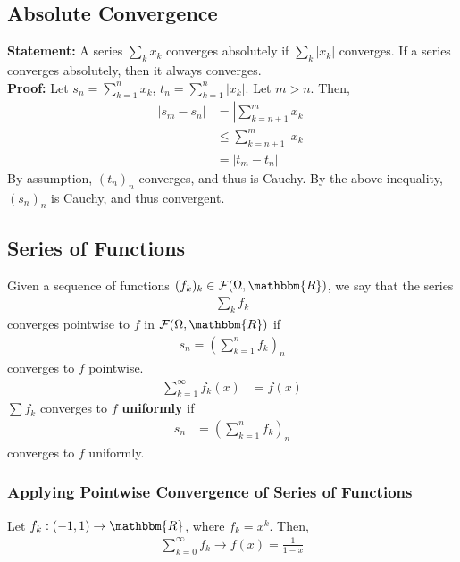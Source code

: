 \documentclass[10pt]{extarticle}
\newcommand{\R}{\mathbbm{R}}
\begin{document}
  \subsection{Absolute Convergence}%
    \textbf{Statement:} A series $\sum_k x_k$ converges absolutely if $\sum_k |x_k|$ converges. If a series converges absolutely, then it always converges.\\

    \textbf{Proof:} Let $s_n = \sum_{k=1}^{n}x_k$, $t_n = \sum_{k=1}^{n}|x_k|$. Let $m > n$. Then,
    \begin{align*}
      \left|s_m - s_n\right| &= \left|\sum_{k=n+1}^{m}x_k\right|\\
                             &\leq \sum_{k=n+1}^{m}|x_k|\tag*{Triangle Inequality}\\
                             &= |t_m - t_n|
    \end{align*}
    By assumption, $(t_n)_n$ converges, and thus is Cauchy. By the above inequality, $(s_n)_n$ is Cauchy, and thus convergent.
  \subsection{Series of Functions}%
    Given a sequence of functions $(f_k)_k \in \mathcal{F}(\Omega,\R)$, we say that the series
    \begin{align*}
      \sum_{k}f_k
    \end{align*}
    converges pointwise to $f$ in $\mathcal{F}(\Omega,\R)$ if
    \begin{align*}
      s_n = \left(\sum_{k=1}^{n}f_k\right)_n
    \end{align*}
    converges to $f$ pointwise.
    \begin{align*}
      \sum_{k=1}^{\infty}f_k(x) &= f(x) \tag*{$\forall x\in\Omega$}
    \end{align*}
    $\sum f_k$ converges to $f$ \textbf{uniformly} if
    \begin{align*}
      s_n &= \left(\sum_{k=1}^{n} f_k\right)_n
    \end{align*}
    converges to $f$ uniformly.
    \subsubsection{Applying Pointwise Convergence of Series of Functions}%
      Let $f_k: (-1,1) \rightarrow \R$, where $f_k = x^k$. Then,
      \begin{align*}
        \sum_{k=0}^{\infty}f_k \rightarrow f(x) = \frac{1}{1-x}
      \end{align*}
\end{document}
